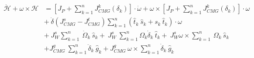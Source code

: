 \begin{tcolorbox}
\begin{equation}
\begin{aligned}
\dot{\mathcal{H}} +\omega \times \mathcal{H} & =
\left[ J_{P} +\sum ^{n}_{k=1} J^{k}_{CMG}( \delta_{k})\right] \cdotp \dot{\omega }+\omega \times \left[ J_{P} +\sum ^{n}_{k=1} J^{k}_{CMG}( \delta_{k})\right] \cdotp \omega \\
 & +\ \dot{\delta}\left( J^{s}_{CMG} -J^{t}_{CMG}\right)\sum ^{n}_{k=1}(\hat{t}_{k} \ \hat{s}_{k} +\hat{s}_{k} \ \hat{t}_{k}) \cdotp \omega \\
 & +\ J^{s}_{W}\sum ^{n}_{k=1} \ \dot{\Omega }_{k} \ \hat{s}_{k} +\ J^{s}_{W} \ \sum ^{n}_{k=1} \Omega _{k}\dot{\delta}_{k} \ \hat{t}_{k} +\ J^{s}_{W} \omega \times \sum ^{n}_{k=1} \ \Omega _{k} \ \hat{s}_{k}\\
 & +J^{g}_{CMG} \ \sum ^{n}_{k=1}\ddot{\delta}_{k} \ \hat{g}_{k} +J^{g}_{CMG} \ \omega \times \sum ^{n}_{k=1}\dot{\delta}_{k} \ \hat{g}_{k}
\end{aligned}
\label{eqn:EOM_FULL}
\end{equation}
\end{tcolorbox}

